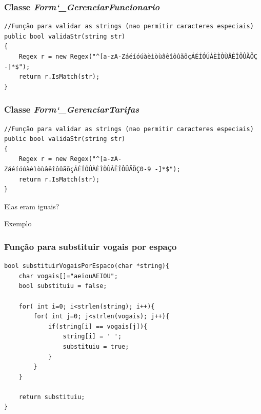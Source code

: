\begin{frame}[fragile]
	\frametitle{Classe \textit{Form\char`_GerenciarFuncionario}}

	\begin{verbatim}
//Função para validar as strings (nao permitir caracteres especiais)
public bool validaStr(string str)
{
	Regex r = new Regex("^[a-zA-ZáéíóúàèìòùâêîôûãõçÁÉÍÓÚÀÈÌÒÙÂÊÎÔÛÃÕÇ -]*$");
    return r.IsMatch(str);
}
	\end{verbatim}

\end{frame}

\begin{frame}[fragile]
	\frametitle{Classe \textit{Form\char`_GerenciarTarifas}}

	\begin{verbatim}
//Função para validar as strings (nao permitir caracteres especiais)
public bool validaStr(string str)
{
	Regex r = new Regex("^[a-zA-ZáéíóúàèìòùâêîôûãõçÁÉÍÓÚÀÈÌÒÙÂÊÎÔÛÃÕÇ0-9 -]*$");
    return r.IsMatch(str);
}
	\end{verbatim}

\end{frame}

\begin{frame}

	\Huge Elas eram iguais?

\end{frame}

\begin{frame}
	\Huge Exemplo
\end{frame}

\begin{frame}[fragile]
	\frametitle{Função para substituir vogais por espaço}

	\begin{verbatim}
bool substituirVogaisPorEspaco(char *string){
	char vogais[]="aeiouAEIOU";
	bool substituiu = false;

	for( int i=0; i<strlen(string); i++){
		for( int j=0; j<strlen(vogais); j++){
			if(string[i] == vogais[j]){
				string[i] = ' ';
				substituiu = true;
			}
		}
	}

	return substituiu;
}
	\end{verbatim}

\end{frame}

